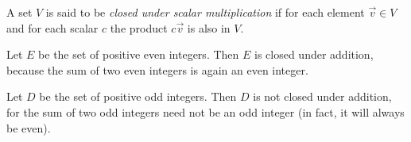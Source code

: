 \documentclass{ximera}
\begin{document}


  \begin{definition} 
  A set $V$ is said to be \emph{closed under scalar multiplication} if for each element $\vec{v} \in V$  and for each scalar $c$ the product $c\vec{v}$ is also in $V$.
\end{definition}


\begin{example}
Let $E$ be the set of positive even integers.  Then $E$ is closed under addition, because the sum of two even integers is again an even integer.
\end{example}

\begin{example}
Let $D$ be the set of positive odd integers.  Then $D$ is not closed under addition, for the sum of two odd integers need not be an odd integer (in fact, it will always be even).
\end{example}
\end{document}

